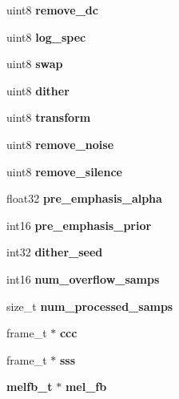 \begin{DoxyCompactItemize}
\item 
uint8 {\bfseries remove\-\_\-dc}\label{structfe__s_ac575bed8a61105f4302bd27246d4c33d}

\item 
uint8 {\bfseries log\-\_\-spec}\label{structfe__s_a7d3d6513ae6b60632d14c1e1d5dfe891}

\item 
uint8 {\bfseries swap}\label{structfe__s_ab08200d2bfc6d868536d802501525179}

\item 
uint8 {\bfseries dither}\label{structfe__s_abd7b32a70dc6512134e39dd54d160689}

\item 
uint8 {\bfseries transform}\label{structfe__s_a49f2e495d938acaf5c918059e99854e2}

\item 
uint8 {\bfseries remove\-\_\-noise}\label{structfe__s_a254fc94d7868163fba6f2d8826d60fa6}

\item 
uint8 {\bfseries remove\-\_\-silence}\label{structfe__s_a8479b916c411d6d0140bf4a16eb83437}

\item 
float32 {\bfseries pre\-\_\-emphasis\-\_\-alpha}\label{structfe__s_aa7dc496e33955b7f06f83715c05ded8e}

\item 
int16 {\bfseries pre\-\_\-emphasis\-\_\-prior}\label{structfe__s_a063765dd6e387065d2dad2cdf514320e}

\item 
int32 {\bfseries dither\-\_\-seed}\label{structfe__s_aa0b7171d2268fd38c7ba01c75dd587ff}

\item 
int16 {\bfseries num\-\_\-overflow\-\_\-samps}\label{structfe__s_ac22fe7c117ef00eb513d7d0771333ddd}

\item 
size\-\_\-t {\bfseries num\-\_\-processed\-\_\-samps}\label{structfe__s_a07994a957d8cc150a4187306b8dcb3b7}

\item 
frame\-\_\-t $\ast$ {\bfseries ccc}\label{structfe__s_afc472de43bd747de659dd57bc9a74fae}

\item 
frame\-\_\-t $\ast$ {\bfseries sss}\label{structfe__s_a6525c59397073d363e1844c28746fcb9}

\item 
{\bf melfb\-\_\-t} $\ast$ {\bfseries mel\-\_\-fb}\label{structfe__s_ae5a054dbac5e32cf028b6d6d4c9391bd}


\end{DoxyCompactItemize}
